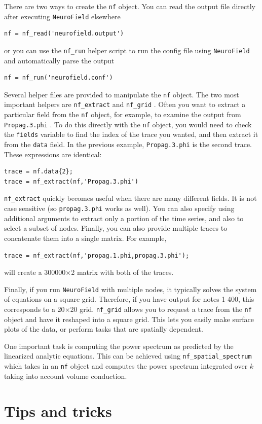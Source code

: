 \documentclass[12pt,a4paper]{article}
\newcommand{\type}[1]{ {\small\small\tt #1} }
\newcommand{\NF}[0]{ \type{NeuroField}}
\begin{document}
There are two ways to create the \type{nf} object. You can read the output file directly after executing \NF elsewhere

\begin{lstlisting}
nf = nf_read('neurofield.output')
\end{lstlisting}

or you can use the \type{nf\_run} helper script to run the config file using \NF and automatically parse the output

\begin{lstlisting}
nf = nf_run('neurofield.conf')
\end{lstlisting}


Several helper files are provided to manipulate the \type{nf} object. The two most important helpers are \type{nf\_extract} and \type{nf\_grid}. Often you want to extract a particular field from the \type{nf} object, for example, to examine the output from \type{Propag.3.phi}. To do this directly with the \type{nf} object, you would need to check the \type{fields} variable to find the index of the trace you wanted, and then extract it from the \type{data} field. In the previous example, \type{Propag.3.phi} is the second trace. These expressions are identical:
\begin{lstlisting}
trace = nf.data{2};
trace = nf_extract(nf,'Propag.3.phi')
\end{lstlisting}
\type{nf\_extract} quickly becomes useful when there are many different fields. It is not case sensitive (so \type{propag.3.phi} works as well). You can also specify using additional arguments to extract only a portion of the time series, and also to select a subset of nodes. Finally, you can also provide multiple traces to concatenate them into a single matrix. For example,
\begin{lstlisting}
trace = nf_extract(nf,'propag.1.phi,propag.3.phi');
\end{lstlisting}
will create a 300000$\times$2 matrix with both of the traces. 

Finally, if you run \NF with multiple nodes, it typically solves the system of equations on a square grid. Therefore, if you have output for notes 1-400, this corresponds to a 20$\times$20 grid. \type{nf\_grid} allows you to request a trace from the \type{nf} object and have it reshaped into a square grid. This lets you easily make surface plots of the data, or perform tasks that are spatially dependent. 

One important task is computing the power spectrum as predicted by the linearized analytic equations. This can be achieved using \type{nf\_spatial\_spectrum} which takes in an \type{nf} object and computes the power spectrum integrated over $k$ taking into account volume conduction. 

\section{Tips and tricks}
\label{sec:tips}
\end{document}

